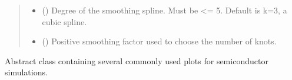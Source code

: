 \documentclass[letterpaper,10pt,english,openany, oneside]{sphinxmanual}
\begin{document}
\begin{fulllineitems}
\begin{quote}
\begin{description}
\begin{itemize}
\item {} 
 () \textendash{} Degree of the smoothing spline. Must be \textless{}= 5.
Default is k=3, a cubic spline.

\item {} 
 () \textendash{} Positive smoothing factor used to choose the number of knots.

\end{itemize}

\end{description}\end{quote}

\end{fulllineitems}


\begin{fulllineitems}
\label{\detokenize{index:fompy.plots.plotStrategy}}
Abstract class containing several commonly used plots for semiconductor simulations.

\end{fulllineitems}

\end{document}
